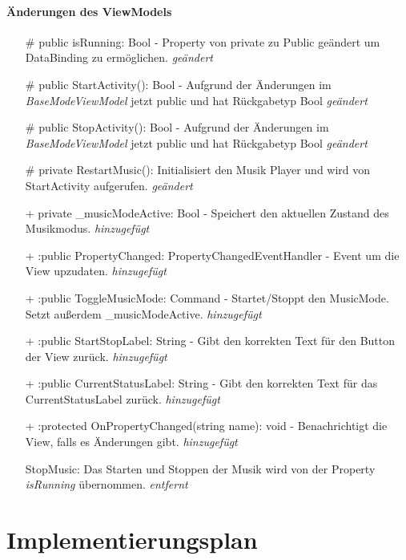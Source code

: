\documentclass[a4paper,12pt]{article}
\begin{document}
\paragraph{Änderungen des ViewModels}
\begin{itemize}
	\item[\#]public isRunning: Bool - Property von private zu Public geändert um DataBinding zu ermöglichen. \textit{geändert}
	\item[\#]public StartActivity(): Bool - Aufgrund der Änderungen im \textit{BaseModeViewModel} jetzt public und hat Rückgabetyp Bool \textit{geändert}
	\item[\#]public StopActivity(): Bool - Aufgrund der Änderungen im \textit{BaseModeViewModel} jetzt public und hat Rückgabetyp Bool \textit{geändert}
	\item[\#]private RestartMusic(): Initialisiert den Musik Player und wird von StartActivity aufgerufen. \textit{geändert}
	\item[+]private \_musicModeActive: Bool - Speichert den aktuellen Zustand des Musikmodus. \textit{hinzugefügt}
	\item[+]:public PropertyChanged: PropertyChangedEventHandler - Event um die View upzudaten. \textit{hinzugefügt}
	\item[+]:public ToggleMusicMode: Command - Startet/Stoppt den MusicMode. Setzt außerdem \_musicModeActive. \textit{hinzugefügt}
	\item[+]:public StartStopLabel: String - Gibt den korrekten Text für den Button der View zurück. \textit{hinzugefügt}
	\item[+]:public CurrentStatusLabel: String - Gibt den korrekten Text für das CurrentStatusLabel zurück. \textit{hinzugefügt}
	\item[+]:protected OnPropertyChanged(string name): void - Benachrichtigt die View, falls es Änderungen gibt. \textit{hinzugefügt}
	\item[\-]StopMusic: Das Starten und Stoppen der Musik wird von der Property \textit{isRunning} übernommen. \textit{entfernt}
\end{itemize}


\section{Implementierungsplan}
\end{document}
